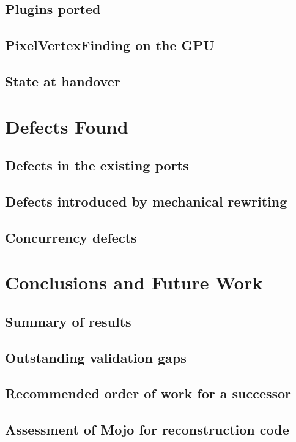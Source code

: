 \documentclass[11pt,a4paper]{report}
\begin{document}
\section{Plugins ported}
\section{PixelVertexFinding on the GPU}
\section{State at handover}

\chapter{Defects Found}
\section{Defects in the existing ports}
\section{Defects introduced by mechanical rewriting}
\section{Concurrency defects}

\chapter{Conclusions and Future Work}
\section{Summary of results}
\section{Outstanding validation gaps}
\section{Recommended order of work for a successor}
\section{Assessment of Mojo for reconstruction code}
\end{document}
